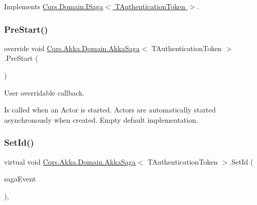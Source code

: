 Implements \hyperlink{interfaceCqrs_1_1Domain_1_1ISaga_a85c75f80bc5be4bad7f1d9f1231bfba7_a85c75f80bc5be4bad7f1d9f1231bfba7}{Cqrs.\+Domain.\+I\+Saga$<$ T\+Authentication\+Token $>$}.

\mbox{\label{classCqrs_1_1Akka_1_1Domain_1_1AkkaSaga_a4615beae56f595074f3ba643a890ba74_a4615beae56f595074f3ba643a890ba74}} 
\subsubsection{\texorpdfstring{Pre\+Start()}{PreStart()}}
{\footnotesize\ttfamily override void \hyperlink{classCqrs_1_1Akka_1_1Domain_1_1AkkaSaga}{Cqrs.\+Akka.\+Domain.\+Akka\+Saga}$<$ T\+Authentication\+Token $>$.Pre\+Start (\begin{DoxyParamCaption}{ }\end{DoxyParamCaption})\hspace{0.3cm}{\ttfamily [protected]}}



User overridable callback. 

Is called when an Actor is started. Actors are automatically started asynchronously when created. Empty default implementation. 

\mbox{\label{classCqrs_1_1Akka_1_1Domain_1_1AkkaSaga_a3f3cf1a10203a1eead599e7529d41613_a3f3cf1a10203a1eead599e7529d41613}} 
\subsubsection{\texorpdfstring{Set\+Id()}{SetId()}}
{\footnotesize\ttfamily virtual void \hyperlink{classCqrs_1_1Akka_1_1Domain_1_1AkkaSaga}{Cqrs.\+Akka.\+Domain.\+Akka\+Saga}$<$ T\+Authentication\+Token $>$.Set\+Id (\begin{DoxyParamCaption}\item[{\hyperlink{interfaceCqrs_1_1Events_1_1ISagaEvent}{I\+Saga\+Event}$<$ T\+Authentication\+Token $>$}]{saga\+Event }\end{DoxyParamCaption})\hspace{0.3cm}{\ttfamily [protected]}, {\ttfamily [virtual]}}



